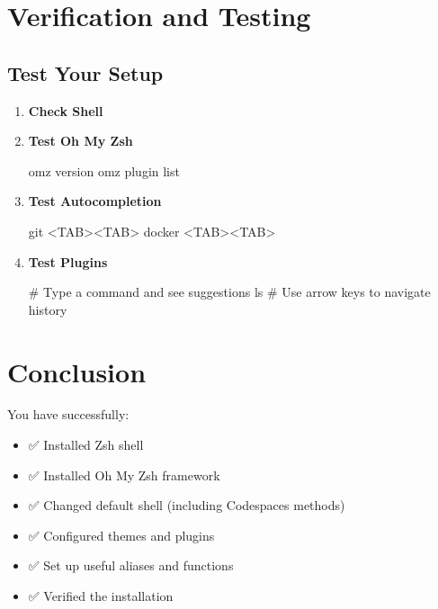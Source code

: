 \documentclass{article}
\begin{document}
\section{Verification and Testing}

\subsection{Test Your Setup}

\begin{enumerate}
    \item \textbf{Check Shell}
    
    \item \textbf{Test Oh My Zsh}
    \begin{codebox}
omz version
omz plugin list
    \end{codebox}
    
    \item \textbf{Test Autocompletion}
    \begin{codebox}
git <TAB><TAB>
docker <TAB><TAB>
    \end{codebox}
    
    \item \textbf{Test Plugins}
    \begin{codebox}
\# Type a command and see suggestions
ls
\# Use arrow keys to navigate history
    \end{codebox}
\end{enumerate}

\section{Conclusion}

You have successfully:

\begin{successbox}
\begin{itemize}
    \item ✅ Installed Zsh shell
    \item ✅ Installed Oh My Zsh framework
    \item ✅ Changed default shell (including Codespaces methods)
    \item ✅ Configured themes and plugins
    \item ✅ Set up useful aliases and functions
    \item ✅ Verified the installation
\end{itemize}
\end{successbox}
\end{document}
